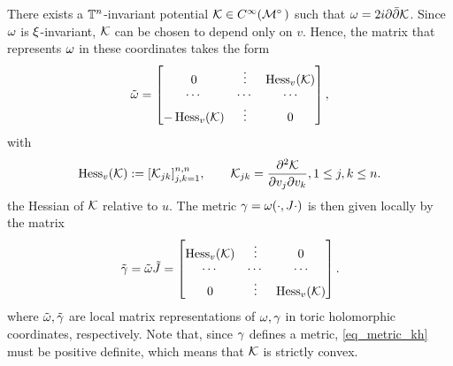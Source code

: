 \documentclass[notas.tex]{subfiles}
\begin{document}
	There exists a $\mathbb{T}^n$-invariant potential $\kpot \in C^\infty(\mfld^\circ)$ such that $\omega = 2i\partial \bar{\partial} \mathcal{K}$. Since $\omega$ is $\xi$-invariant, $\mathcal{K}$ can be chosen to depend only on $v$. Hence, the matrix that represents $\omega$ in these coordinates takes the form
	\begin{align*}
		\tilde{\omega} = \begin{bmatrix}
			0 & \vdots & \operatorname{Hess}_v(\mathcal{K}) \\
			\cdots & \cdots & \cdots \\
			-\operatorname{Hess}_v(\mathcal{K}) & \vdots & 0
		\end{bmatrix},
	\end{align*}
	with 
	\begin{align*}
		\operatorname{Hess}_v(\mathcal{K}) := [\mathcal{K}_{jk}]_{j,k=1}^{n,n}, \qquad \mathcal{K}_{jk}=\frac{\partial^2 \mathcal{K}}{\partial v_j \partial v_k}, 1 \leq j,k \leq n.
	\end{align*}
	the Hessian of $\mathcal{K}$ relative to $u$. The metric $\gamma = \omega(\cdot,J\cdot)$ is then given locally by the matrix
	\begin{align} \label{eq_metric_kh}
		\tilde{\gamma} = \tilde{\omega} \tilde{J} = \begin{bmatrix}
			\operatorname{Hess}_v(\mathcal{K}) & \vdots & 0\\
			\cdots & \cdots & \cdots \\
			0 & \vdots & \operatorname{Hess}_v(\mathcal{K})
		\end{bmatrix}.
	\end{align}
	where $\tilde {\omega}, \tilde {\gamma}$ are local matrix representations of $\omega, \gamma$ in toric holomorphic coordinates, respectively. Note that, since $\gamma$ defines a metric, \eqref{eq_metric_kh} must be positive definite, which means that $\mathcal{K}$ is strictly convex.
\end{document}
